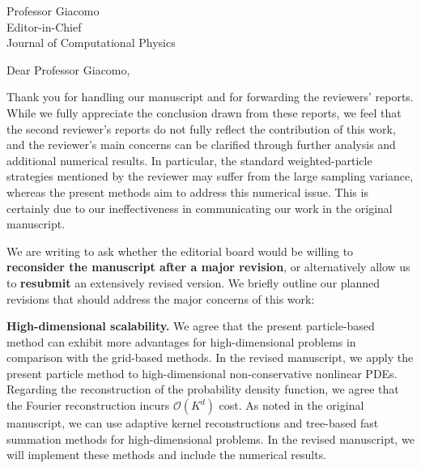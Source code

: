 \documentclass[11pt]{letter}
\begin{document}
\begin{letter}{Professor Giacomo \\ Editor-in-Chief \\ Journal of Computational Physics}

\opening{Dear Professor Giacomo,}


Thank you for handling our manuscript and for forwarding the reviewers' reports. 
While we fully appreciate the conclusion drawn from these reports, we feel that the second reviewer's reports do not fully reflect the contribution of this work, and the reviewer's main concerns can be clarified through further analysis and additional numerical results. 
%
In particular, the standard weighted-particle strategies mentioned by the reviewer may suffer from the large sampling variance, whereas the present methods aim to address this numerical issue. 
This is certainly due to our ineffectiveness in communicating our work in the original manuscript.  


We are writing to ask whether the editorial board would be willing to \textbf{reconsider the manuscript after a major revision}, or alternatively allow us to \textbf{resubmit} an extensively revised version. 
%
%
We briefly outline our planned revisions that should address the major concerns of this work:


\textbf{High-dimensional scalability.} We agree that the present particle-based method can exhibit more advantages for high-dimensional problems in comparison with the grid-based methods. In the revised manuscript, we apply the present particle method to high-dimensional non-conservative nonlinear PDEs. Regarding the reconstruction of the probability density function, we agree that the Fourier reconstruction incurs $\mathcal{O}(K^d)$ cost. As noted in the original manuscript, we can use adaptive kernel reconstructions and tree-based fast summation methods for high-dimensional problems. In the revised manuscript, we will implement these methods and include the numerical results.



\end{letter}
\end{document}
